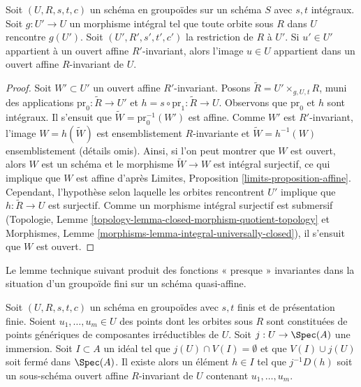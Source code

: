 \begin{lemma}
\label{lemma-find-affine-integral}
Soit $(U, R, s, t, c)$ un schéma en groupoïdes sur un schéma $S$
avec $s, t$ intégraux. Soit $g : U' \to U$ un morphisme intégral
tel que toute orbite sous $R$ dans $U$ rencontre $g(U')$. Soit $(U', R', s', t', c')$
la restriction de $R$ à $U'$. Si $u' \in U'$ appartient à un
ouvert affine $R'$-invariant, alors l'image $u \in U$ appartient
dans un ouvert affine $R$-invariant de $U$.
\end{lemma}

\begin{proof}
Soit $W' \subset U'$ un ouvert affine $R'$-invariant.
Posons $\tilde R = U' \times_{g, U, t} R$, muni des applications
$\text{pr}_0 : \tilde R \to U'$ et $h = s \circ \text{pr}_1 : \tilde R \to U$.
Observons que $\text{pr}_0$ et $h$ sont intégraux.
Il s'ensuit que $\tilde W = \text{pr}_0^{-1}(W')$ est affine.
Comme $W'$ est $R'$-invariant, l'image
$W = h(\tilde W)$ est ensemblistement $R$-invariante et
$\tilde W = h^{-1}(W)$ ensemblistement (détails omis).
Ainsi, si l'on peut montrer que $W$ est ouvert, alors $W$ est un schéma
et le morphisme $\tilde W \to W$ est intégral surjectif,
ce qui implique que $W$ est affine d'après
Limites, Proposition \ref{limits-proposition-affine}.
Cependant, l'hypothèse selon laquelle les orbites rencontrent $U'$ implique
que $h : \tilde R \to U$ est surjectif. Comme un
morphisme intégral surjectif est submersif
(Topologie, Lemme \ref{topology-lemma-closed-morphism-quotient-topology}
et Morphismes, Lemme \ref{morphisms-lemma-integral-universally-closed}),
il s'ensuit que $W$ est ouvert.
\end{proof}

\noindent
Le lemme technique suivant produit des fonctions « presque » invariantes
dans la situation d'un groupoïde fini sur un
schéma quasi-affine.

\begin{lemma}
\label{lemma-find-almost-invariant-function}
Soit $(U, R, s, t, c)$ un schéma en groupoïdes avec $s, t$ finis et de
présentation finie. Soient $u_1, \ldots, u_m \in U$ des points dont les orbites sous $R$
sont constituées de points génériques de composantes irréductibles de $U$.
Soit $j : U \to \Spec(A)$ une immersion.
Soit $I \subset A$ un idéal tel que $j(U) \cap V(I) = \emptyset$
et que $V(I) \cup j(U)$ soit fermé dans $\Spec(A)$.
Il existe alors un élément $h \in I$ tel que $j^{-1}D(h)$
soit un sous-schéma ouvert affine $R$-invariant de $U$ contenant
$u_1, \ldots, u_m$.
\end{lemma}

